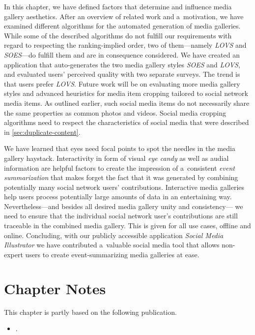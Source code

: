 In this chapter, we have defined factors that determine and influence
media gallery aesthetics.
After an overview of related work and a~motivation,
we have examined different algorithms for the automated generation
of media galleries.
While some of the described algorithms do not fulfill our requirements
with regard to respecting the ranking-implied order,
two of them---namely \emph{LOVS} and \emph{SOES}---do fulfill them
and are in consequence considered.
We have created an application that auto-generates the
two media gallery styles \emph{SOES} and \emph{LOVS},
and evaluated users' perceived quality with two separate surveys.
The trend is that users prefer \emph{LOVS}.
Future work will be on evaluating more media gallery styles
and advanced heuristics for media item cropping
tailored to social network media items.
As outlined earlier, such social media items
do not necessarily share the same properties as
common photos and videos.
Social media cropping algorithms need to respect
the characteristics of social media
that were described in \autoref{sec:duplicate-content}.

We have learned that eyes need focal points
to spot the needles in the media gallery haystack.
Interactivity in form of visual \emph{eye candy}
as well as audial information are helpful factors
to create the impression of a~consistent \emph{event summarization}
that makes forget the fact that it was generated by combining potentially
many social network users' contributions.
Interactive media galleries help users process potentially
large amounts of data in an entertaining way.
Nevertheless---and besides all desired media gallery unity and consistency---%
we need to ensure that the individual social network user's contributions
are still traceable in the combined media gallery.
This is given for all use cases, offline and online.
Concluding, with our publicly accessible application \emph{Social Media Illustrator}
we have contributed a~valuable social media tool
that allows non-expert users to create event-summarizing media galleries at ease.

\section*{Chapter Notes}
This chapter is partly based on the following publication.

\begin{itemize}
  \item {}.
\end{itemize}

\clearpage
\printbibliography[heading=subbibliography]